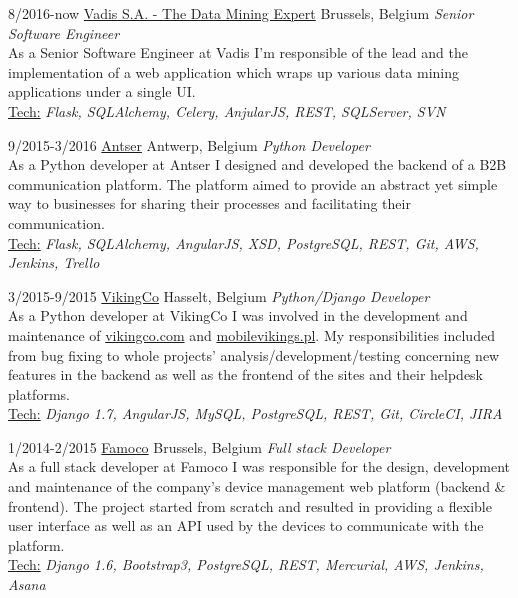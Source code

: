\documentclass[]{friggeri-cv} %
\begin{document}
\begin{entrylist}

\entry
{8/2016-now}
{\href{http://www.vadis.com}{Vadis S.A. - The Data Mining Expert}}
{Brussels, Belgium}
{\emph{Senior Software Engineer} \\
As a Senior Software Engineer at Vadis I'm responsible of the lead and the implementation of a web application which wraps up various data mining applications under a single UI.\\
\ul{Tech:} \emph{Flask, SQLAlchemy, Celery, AnjularJS, REST, SQLServer, SVN}
}


\entry
{9/2015-3/2016}
{\href{http://antser.be}{Antser}}
{Antwerp, Belgium}
{\emph {Python Developer} \\
As a Python developer at Antser I designed and developed the backend of a B2B communication platform. The platform aimed to provide an abstract yet simple way to businesses for sharing their processes and facilitating their communication.\\
\ul{Tech:} \emph{Flask, SQLAlchemy, AngularJS, XSD, PostgreSQL, REST, Git, AWS, Jenkins, Trello}
}

\entry
{3/2015-9/2015}
{\href{http://vikingco.com}{VikingCo}}
{Hasselt, Belgium}
{\emph {Python/Django Developer} \\
As a Python developer at VikingCo I was involved in the development and maintenance of \href{https://vikingco.com}{vikingco.com} and \href{https://mobilevikings.pl}{mobilevikings.pl}. My responsibilities included from bug fixing to whole projects' analysis/development/testing concerning new features in the backend as well as the frontend of the sites and their helpdesk platforms.\\
\ul{Tech:} \emph{Django 1.7, AngularJS, MySQL, PostgreSQL, REST, Git, CircleCI, JIRA}
}

\entry
{1/2014-2/2015}
{\href{http://famoco.com}{Famoco}}
{Brussels, Belgium}
{\emph {Full stack Developer} \\
As a full stack developer at Famoco I was responsible for the design, development and maintenance of the company's device management web platform (backend \& frontend). The project started from scratch and resulted in providing a flexible user interface as well as an API used by the devices to communicate with the platform. \\
\ul{Tech:} \emph{Django 1.6, Bootstrap3, PostgreSQL, REST, Mercurial, AWS, Jenkins, Asana}
}

\end{entrylist}
\end{document}
